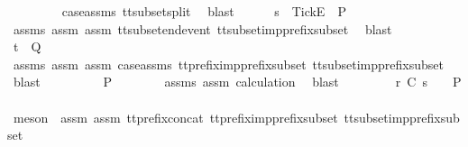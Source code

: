 \begin{isabellebody}
\ \ \ \ \ \ \isamarkupfalse%
\ {\isachardoublequoteopen}{}{\isachardoublequoteclose}\ case{\isacharunderscore}assms{\isacharparenleft}{}{\isacharparenright}\ tt{\isacharunderscore}subset{\isacharunderscore}split\ \isamarkupfalse%
\ blast\isanewline
\ \ \ \ \isamarkupfalse%
\ {\isachardoublequoteopen}s{\isacharprime}\ {\isacharat}\ {\isacharbrackleft}{\isacharbrackleft}Tick{\isacharbrackright}\isactrlsub E{\isacharbrackright}\ {\isasymin}\ P{\isachardoublequoteclose}\isanewline
\ \ \ \ \ \ \isamarkupfalse%
\ {\isasymrho}{\isacharunderscore}assms\ assm{}\ assm{}\ tt{\isacharunderscore}subset{\isacharunderscore}end{\isacharunderscore}event\ tt{\isacharunderscore}subset{\isacharunderscore}imp{\isacharunderscore}prefix{\isacharunderscore}subset\ \isamarkupfalse%
\ blast\isanewline
\ \ \ \ \isamarkupfalse%
\ \isamarkupfalse%
\ {\isachardoublequoteopen}t{\isacharprime}{\isacharprime}\ {\isasymin}\ Q{\isachardoublequoteclose}\isanewline
\ \ \ \ \ \ \isamarkupfalse%
\ {\isasymrho}{\isacharunderscore}assms\ assm{}\ assm{}\ case{\isacharunderscore}assms{\isacharparenleft}{}{\isacharparenright}\ tt{\isacharunderscore}prefix{\isacharunderscore}imp{\isacharunderscore}prefix{\isacharunderscore}subset\ tt{\isacharunderscore}subset{\isacharunderscore}imp{\isacharunderscore}prefix{\isacharunderscore}subset\ \isamarkupfalse%
\ blast\isanewline
\ \ \ \ \isamarkupfalse%
\ \isamarkupfalse%
\ {\isachardoublequoteopen}{\isasymrho}\ {\isasymin}\ P{\isachardoublequoteclose}\isanewline
\ \ \ \ \ \ \isamarkupfalse%
\ {\isasymrho}{\isacharunderscore}assms\ assm{}\ calculation\ \isamarkupfalse%
\ blast\isanewline
\ \ \isamarkupfalse%
\isanewline
\ \ \ \ \isamarkupfalse%
\ {\isachardoublequoteopen}r\ {\isasymle}\isactrlsub C\ s\ {\isasymLongrightarrow}\ {\isasymrho}\ {\isasymin}\ P{\isachardoublequoteclose}\isanewline
\ \ \ \ \ \ \isamarkupfalse%
\ {\isacharparenleft}meson\ {\isachardoublequoteopen}{}{\isachardoublequoteclose}\ assm{}\ assm{}\ tt{\isacharunderscore}prefix{\isacharunderscore}concat\ tt{\isacharunderscore}prefix{\isacharunderscore}imp{\isacharunderscore}prefix{\isacharunderscore}subset\ tt{\isacharunderscore}subset{\isacharunderscore}imp{\isacharunderscore}prefix{\isacharunderscore}subset{\isacharparenright}\isanewline

\end{isabellebody}
